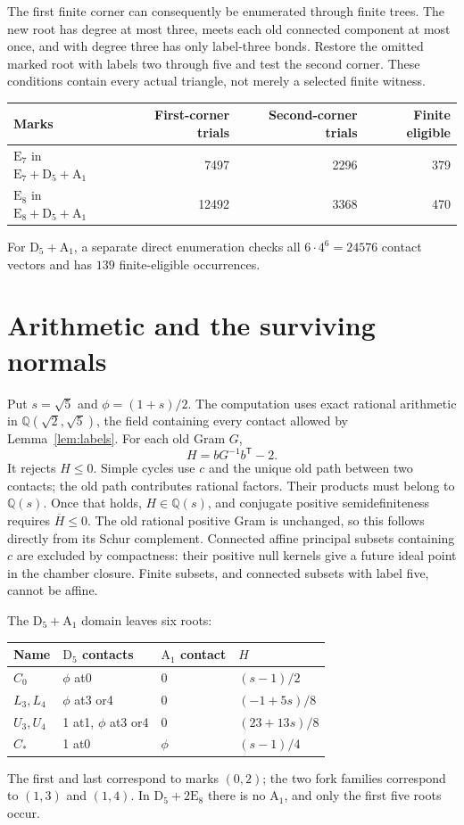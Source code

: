 \documentclass[11pt]{article}
\newcommand{\E}{\mathrm E}
\newcommand{\D}{\mathrm D}
\newcommand{\A}{\mathrm A}
\begin{document}
The first finite corner can consequently be enumerated through finite
trees. The new root has degree at most three, meets each old connected
component at most once, and with degree three has only label-three
bonds. Restore the omitted marked root with labels two through five
and test the second corner. These conditions contain every actual
triangle, not merely a selected finite witness.

\begin{center}
\begin{tabular}{lrrr}
\toprule
Marks & First-corner trials & Second-corner trials & Finite eligible\\
\midrule
$\E_7$ in $\E_7+\D_5+\A_1$ &7497&2296&379\\
$\E_8$ in $\E_8+\D_5+\A_1$ &12492&3368&470\\
\bottomrule
\end{tabular}
\end{center}
For $\D_5+\A_1$, a separate direct enumeration checks all
$6\cdot4^6=24576$ contact vectors and has $139$ finite-eligible occurrences.

\section{Arithmetic and the surviving normals}
Put $s=\sqrt5$ and $\phi=(1+s)/2$. The computation uses exact rational
arithmetic in $\mathbb Q(\sqrt2,\sqrt5)$, the field containing every
contact allowed by Lemma~\ref{lem:labels}. For each old Gram $G$,
\[
 H=bG^{-1}b^{\mathsf T}-2.
\]
It rejects $H\le0$. Simple cycles use $c$ and the unique old path
between two contacts; the old path contributes rational factors.
Their products must belong to $\mathbb Q(s)$. Once that holds,
$H\in\mathbb Q(s)$, and conjugate positive semidefiniteness requires
$\overline H\le0$. The old rational positive Gram is unchanged, so
this follows directly from its Schur complement. Connected affine
principal subsets containing $c$ are excluded by compactness: their
positive null kernels give a future ideal point in the chamber closure.
Finite subsets, and connected subsets with label five, cannot be affine.

The $\D_5+\A_1$ domain leaves six roots:
\begin{center}\small
\begin{tabular}{llll}
\toprule
Name & $\D_5$ contacts & $\A_1$ contact & $H$\\
\midrule
$C_0$&$\phi$ at0&0&$(s-1)/2$\\
$L_3,L_4$&$\phi$ at3 or4&0&$(-1+5s)/8$\\
$U_3,U_4$&1 at1, $\phi$ at3 or4&0&$(23+13s)/8$\\
$C_*$&1 at0&$\phi$&$(s-1)/4$\\
\bottomrule
\end{tabular}
\end{center}
The first and last correspond to marks $(0,2)$; the two fork families
correspond to $(1,3)$ and $(1,4)$. In $\D_5+2\E_8$ there is no
$\A_1$, and only the first five roots occur.
\end{document}
